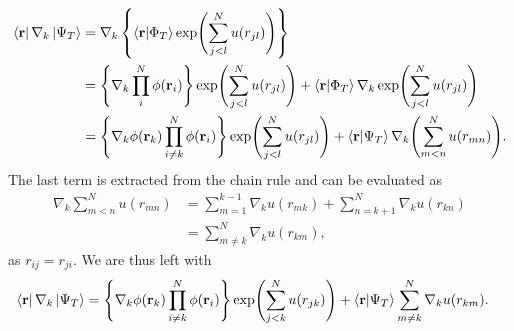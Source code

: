 \documentclass[
    a4paper, aps, twocolumn, floatfix, superscriptaddress]{revtex4-1}
\newcommand{\vf}{\mathbf}
\newcommand{\1}{\mathds{1}}
\newcommand{\brac}[1]{\left\{#1\right\}}
\begin{document}
            \begin{widetext}
                \begin{align}
                    \bra{\vf{r}}\nabla_k\ket{\Psi_T}
                    &= \nabla_k\brac{
                        \bra{\vf{r}}\ket{\Phi_T}
                        \exp\Biggl(
                            \sum_{j < l}^N u(r_{jl})
                        \Biggr)
                    } \\
                    &=
                    \Biggl\{
                        \nabla_k
                        \prod_i^N\phi(\vf{r}_i)
                    \Biggr\}
                    \exp\Biggl(
                        \sum_{j < l}^N u(r_{jl})
                    \Biggr)
                    +
                    \bra{\vf{r}}\ket{\Phi_T}
                    \nabla_k
                    \exp\Biggl(
                        \sum_{j < l}^N u(r_{jl})
                    \Biggr) \\
                    &=
                    \Biggl\{
                        \nabla_k\phi(\vf{r}_k)
                        \prod_{i \neq k}^N \phi(\vf{r}_i)
                    \Biggr\}
                    \exp\Biggl(
                        \sum_{j < l}^N u(r_{jl})
                    \Biggr)
                    +
                    \bra{\vf{r}}\ket{\Psi_T}
                    \nabla_k
                    \Biggl(
                        \sum_{m < n}^N u(r_{mn})
                    \Biggr).
                \end{align}
            The last term is extracted from the chain rule and can be evaluated
            as
            \begin{align}
                \nabla_k
                    \sum_{m < n}^N u(r_{mn})
                &=
                \sum_{m = 1}^{k - 1}
                \nabla_k u(r_{mk})
                +
                \sum_{n = k + 1}^N
                \nabla_k u(r_{kn}) \\
                &=
                \sum_{m \neq k}^N\nabla_k u(r_{km}),
            \end{align}
            as $r_{ij} = r_{ji}$.  We are thus left with
            \begin{align}
                \bra{\vf{r}}\nabla_k\ket{\Psi_T}
                &=
                \Biggl\{
                    \nabla_k\phi(\vf{r}_k)
                    \prod_{i \neq k}^N \phi(\vf{r}_i)
                \Biggr\}
                \exp\Biggl(
                    \sum_{j < k}^N u(r_{jk})
                \Biggr)
                +
                \bra{\vf{r}}\ket{\Psi_T}
                \sum_{m \neq k}^N\nabla_k u(r_{km}).
            \end{align}
            \end{widetext}
\end{document}
